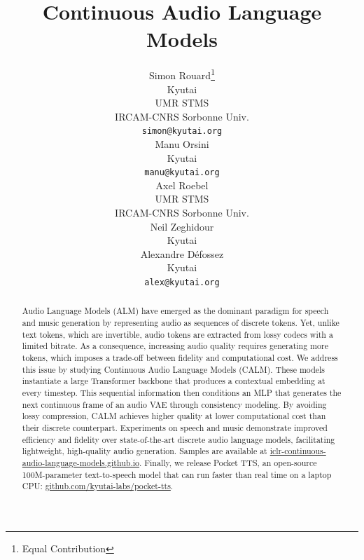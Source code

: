 \documentclass{article} %
\title{Continuous Audio Language Models}
\author{%
  Simon Rouard\thanks{Equal Contribution} \\
  Kyutai \\ 
  UMR STMS \\
  IRCAM-CNRS Sorbonne Univ. \\
  \texttt{simon@kyutai.org}\\
   \And
   Manu Orsini\footnotemark[1] \\
   Kyutai \\
   \texttt{manu@kyutai.org}\\
   \And
   Axel Roebel \\
  UMR STMS \\
  IRCAM-CNRS Sorbonne Univ. \\
   \And
   Neil Zeghidour \\
   Kyutai \\
   \And
   Alexandre Défossez \\
   Kyutai \\
   \texttt{alex@kyutai.org}\\
    }
\begin{document}
\maketitle

\begin{abstract}
   Audio Language Models (ALM) have emerged as the dominant paradigm for speech and music generation by representing audio as sequences of discrete tokens. Yet, unlike text tokens, which are invertible, audio tokens are extracted from lossy codecs with a limited bitrate. As a consequence, increasing audio quality requires generating more tokens, which imposes a trade-off between fidelity and computational cost. We address this issue by studying Continuous Audio Language Models (CALM). These models instantiate a large Transformer backbone that produces a contextual embedding at every timestep. This sequential information then conditions an MLP that generates the next continuous frame of an audio VAE through consistency modeling. By avoiding lossy compression, CALM achieves higher quality at lower computational cost than their discrete counterpart. Experiments on speech and music demonstrate improved efficiency and fidelity over state-of-the-art discrete audio language models, facilitating lightweight, high-quality audio generation.
   Samples are available at \href{https://iclr-continuous-audio-language-models.github.io}{iclr-continuous-audio-language-models.github.io}. Finally, we release Pocket TTS, an open-source 100M-parameter text-to-speech model that can run faster than real time on a laptop CPU: \href{https://github.com/kyutai-labs/pocket-tts}{github.com/kyutai-labs/pocket-tts}.
\end{abstract}










\newpage

\end{document}
